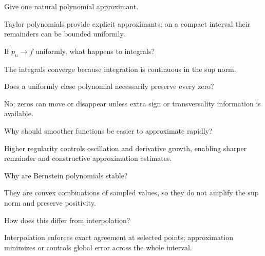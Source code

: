 \begin{problem}[Approximation of $e^x$]\label{prob:ii21-problem-07}
Give one natural polynomial approximant.
\end{problem}
\begin{solution}
Taylor polynomials provide explicit approximants; on a compact interval their remainders can be bounded uniformly.
\end{solution}

\begin{problem}\label{prob:ii21-problem-08}
If $p_n\to f$ uniformly, what happens to integrals?
\end{problem}
\begin{solution}
The integrals converge because integration is continuous in the sup norm.
\end{solution}

\begin{problem}\label{prob:ii21-problem-09}
Does a uniformly close polynomial necessarily preserve every zero?
\end{problem}
\begin{solution}
No; zeros can move or disappear unless extra sign or transversality information is available.
\end{solution}

\begin{problem}\label{prob:ii21-problem-10}
Why should smoother functions be easier to approximate rapidly?
\end{problem}
\begin{solution}
Higher regularity controls oscillation and derivative growth, enabling sharper remainder and constructive approximation estimates.
\end{solution}

\begin{problem}\label{prob:ii21-problem-11}
Why are Bernstein polynomials stable?
\end{problem}
\begin{solution}
They are convex combinations of sampled values, so they do not amplify the sup norm and preserve positivity.
\end{solution}

\begin{problem}\label{prob:ii21-problem-12}
How does this differ from interpolation?
\end{problem}
\begin{solution}
Interpolation enforces exact agreement at selected points; approximation minimizes or controls global error across the whole interval.
\end{solution}

